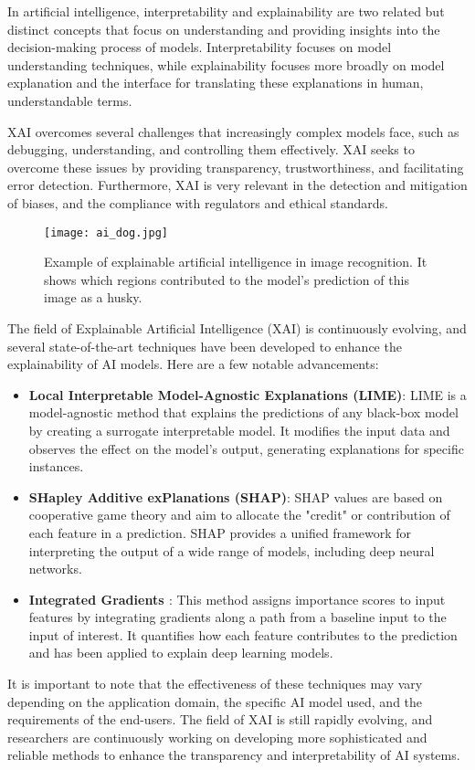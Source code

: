 In artificial intelligence, interpretability and explainability are two related but distinct concepts that focus on understanding and providing insights into the decision-making process of models. Interpretability focuses on model understanding techniques, while explainability focuses more broadly on model explanation and the interface for translating these explanations in human, understandable terms.

XAI overcomes several challenges that increasingly complex models face, such as debugging, understanding, and controlling them effectively. XAI seeks to overcome these issues by providing transparency, trustworthiness, and facilitating error detection. Furthermore, XAI is very relevant in the detection and mitigation of biases, and  the compliance with regulators and ethical standards.

\begin{figure}[!ht]
  \centering
  \texttt{[image: ai\_dog.jpg]}
  \caption{Example of explainable artificial intelligence in image recognition. It shows which regions contributed to the model's prediction of this image as a husky. \cite{xai_pic}}
  \label{fig:ai_dog}
\end{figure}

The field of Explainable Artificial Intelligence (XAI) is continuously evolving, and several state-of-the-art techniques have been developed to enhance the explainability of AI models. Here are a few notable advancements:

\begin{itemize}
  \item \textbf{Local Interpretable Model-Agnostic Explanations \cite{lime} (LIME)}: LIME is a model-agnostic method that explains the predictions of any black-box model by creating a surrogate interpretable model. It modifies the input data and observes the effect on the model's output, generating explanations for specific instances.
  \item \textbf{SHapley Additive exPlanations \cite{shap} (SHAP)}: SHAP values are based on cooperative game theory and aim to allocate the "credit" or contribution of each feature in a prediction. SHAP provides a unified framework for interpreting the output of a wide range of models, including deep neural networks.
  \item \textbf{Integrated Gradients \cite{integrated_gradients}}: This method assigns importance scores to input features by integrating gradients along a path from a baseline input to the input of interest. It quantifies how each feature contributes to the prediction and has been applied to explain deep learning models.
\end{itemize}

It is important to note that the effectiveness of these techniques may vary depending on the application domain, the specific AI model used, and the requirements of the end-users. The field of XAI is still rapidly evolving, and researchers are continuously working on developing more sophisticated and reliable methods to enhance the transparency and interpretability of AI systems.